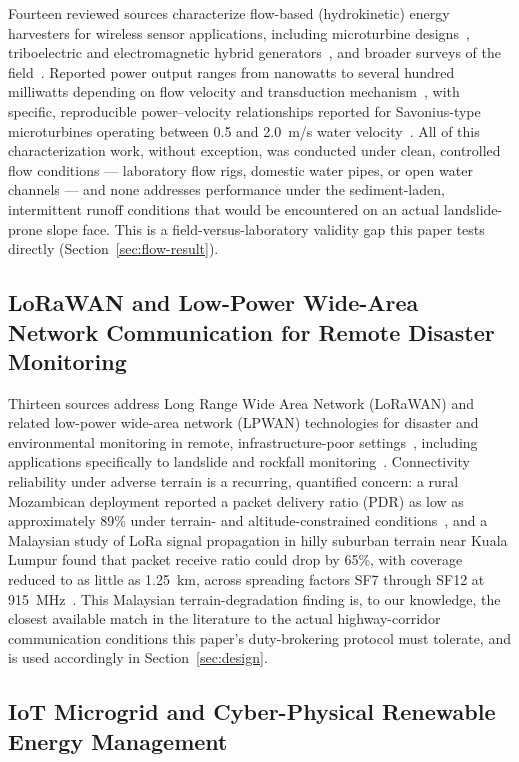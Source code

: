 \documentclass[electronics,article,submit,moreauthors]{Definitions/mdpi}
\begin{document}
Fourteen reviewed sources characterize flow-based (hydrokinetic) energy harvesters for wireless sensor applications, including microturbine designs~\cite{ref66,ref71}, triboelectric and electromagnetic hybrid generators~\cite{ref67,ref68}, and broader surveys of the field~\cite{ref69,ref76,ref79}. Reported power output ranges from nanowatts to several hundred milliwatts depending on flow velocity and transduction mechanism~\cite{ref69}, with specific, reproducible power--velocity relationships reported for Savonius-type microturbines operating between 0.5 and 2.0~m/s water velocity~\cite{ref66}. All of this characterization work, without exception, was conducted under clean, controlled flow conditions --- laboratory flow rigs, domestic water pipes, or open water channels --- and none addresses performance under the sediment-laden, intermittent runoff conditions that would be encountered on an actual landslide-prone slope face. This is a field-versus-laboratory validity gap this paper tests directly (Section~\ref{sec:flow-result}).

\subsection{LoRaWAN and Low-Power Wide-Area Network Communication for Remote Disaster Monitoring}

Thirteen sources address Long Range Wide Area Network (LoRaWAN) and related low-power wide-area network (LPWAN) technologies for disaster and environmental monitoring in remote, infrastructure-poor settings~\cite{ref81,ref83,ref84,ref87}, including applications specifically to landslide and rockfall monitoring~\cite{ref86,ref93}. Connectivity reliability under adverse terrain is a recurring, quantified concern: a rural Mozambican deployment reported a packet delivery ratio (PDR) as low as approximately 89\% under terrain- and altitude-constrained conditions~\cite{ref92}, and a Malaysian study of LoRa signal propagation in hilly suburban terrain near Kuala Lumpur found that packet receive ratio could drop by 65\%, with coverage reduced to as little as 1.25~km, across spreading factors SF7 through SF12 at 915~MHz~\cite{ref28}. This Malaysian terrain-degradation finding is, to our knowledge, the closest available match in the literature to the actual highway-corridor communication conditions this paper's duty-brokering protocol must tolerate, and is used accordingly in Section~\ref{sec:design}.

\subsection{IoT Microgrid and Cyber-Physical Renewable Energy Management}
\end{document}
